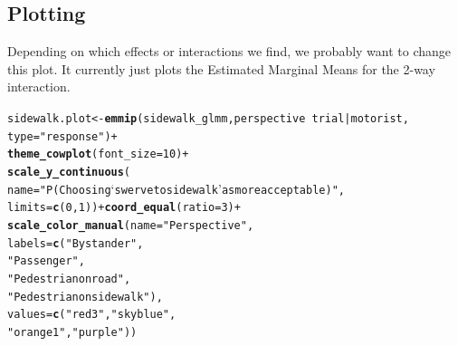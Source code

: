 \documentclass{scrartcl}\usepackage[]{graphicx}\usepackage[]{color}
\makeatletter
\newcommand{\hlnum}[1]{\textcolor[rgb]{0.686,0.059,0.569}{#1}}%
\newcommand{\hlstr}[1]{\textcolor[rgb]{0.192,0.494,0.8}{#1}}%
\newcommand{\hlopt}[1]{\textcolor[rgb]{0,0,0}{#1}}%
\newcommand{\hlstd}[1]{\textcolor[rgb]{0.345,0.345,0.345}{#1}}%
\newcommand{\hlkwb}[1]{\textcolor[rgb]{0.69,0.353,0.396}{#1}}%
\newcommand{\hlkwc}[1]{\textcolor[rgb]{0.333,0.667,0.333}{#1}}%
\newcommand{\hlkwd}[1]{\textcolor[rgb]{0.737,0.353,0.396}{\textbf{#1}}}%
\newenvironment{kframe}{%
 \def\at@end@of@kframe{}%
 \ifinner\ifhmode%
  \def\at@end@of@kframe{\end{minipage}}%
  \begin{minipage}{\columnwidth}%
 \fi\fi%
 \def\FrameCommand##1{\hskip\@totalleftmargin \hskip-\fboxsep
 \colorbox{shadecolor}{##1}\hskip-\fboxsep
     \hskip-\linewidth \hskip-\@totalleftmargin \hskip\columnwidth}%
 \MakeFramed {\advance\hsize-\width
   \@totalleftmargin\z@ \linewidth\hsize
   \@setminipage}}%
 {\par\unskip\endMakeFramed%
 \at@end@of@kframe}
\newenvironment{knitrout}{}{} %
\makeatother
\begin{document}
\subsection{Plotting}
\label{sec:sidewalk-plot}

Depending on which effects or interactions we find, we probably want to change this plot. It currently just plots the Estimated Marginal Means for the 2-way interaction.

\begin{knitrout}
\color{fgcolor}\begin{kframe}
\begin{alltt}
\hlstd{sidewalk.plot} \hlkwb{<-} \hlkwd{emmip}\hlstd{(sidewalk_glmm, perspective} \hlopt{~} \hlstd{trial} \hlopt{|} \hlstd{motorist,}
                       \hlkwc{type} \hlstd{=} \hlstr{"response"}\hlstd{)} \hlopt{+}
    \hlkwd{theme_cowplot}\hlstd{(}\hlkwc{font_size} \hlstd{=} \hlnum{10}\hlstd{)} \hlopt{+}
    \hlkwd{scale_y_continuous}\hlstd{(}
        \hlkwc{name} \hlstd{=} \hlstr{"P(Choosing `swerve to sidewalk' as more acceptable)"}\hlstd{,}
                       \hlkwc{limits} \hlstd{=} \hlkwd{c}\hlstd{(}\hlnum{0}\hlstd{,} \hlnum{1}\hlstd{))} \hlopt{+} \hlkwd{coord_equal}\hlstd{(}\hlkwc{ratio} \hlstd{=} \hlnum{3}\hlstd{)} \hlopt{+}
    \hlkwd{scale_color_manual}\hlstd{(}\hlkwc{name} \hlstd{=} \hlstr{"Perspective"}\hlstd{,}
                       \hlkwc{labels} \hlstd{=} \hlkwd{c}\hlstd{(}\hlstr{"Bystander"}\hlstd{,}
                                  \hlstr{"Passenger"}\hlstd{,}
                                  \hlstr{"Pedestrian on road"}\hlstd{,}
                                  \hlstr{"Pedestrian on sidewalk"}\hlstd{),}
                       \hlkwc{values} \hlstd{=} \hlkwd{c}\hlstd{(}\hlstr{"red3"}\hlstd{,} \hlstr{"skyblue"}\hlstd{,}
                                  \hlstr{"orange1"}\hlstd{,} \hlstr{"purple"}\hlstd{))}


\end{alltt}
\end{kframe}
\end{knitrout}
\end{document}

